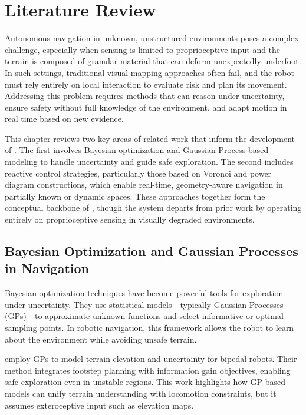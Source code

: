 \chapter{\leavevmode \newline Literature Review}
\label{chap:Literature Review}

Autonomous navigation in unknown, unstructured environments poses a complex challenge, especially when sensing is limited to proprioceptive input and the terrain is composed of granular material that can deform unexpectedly underfoot. In such settings, traditional visual mapping approaches often fail, and the robot must rely entirely on local interaction to evaluate risk and plan its movement. Addressing this problem requires methods that can reason under uncertainty, ensure safety without full knowledge of the environment, and adapt motion in real time based on new evidence.

This chapter reviews two key areas of related work that inform the development of \algoname. The first involves Bayesian optimization and Gaussian Process-based modeling to handle uncertainty and guide safe exploration. The second includes reactive control strategies, particularly those based on Voronoi and power diagram constructions, which enable real-time, geometry-aware navigation in partially known or dynamic spaces. These approaches together form the conceptual backbone of \algoname, though the system departs from prior work by operating entirely on proprioceptive sensing in visually degraded environments.

\section{Bayesian Optimization and Gaussian Processes in Navigation}

Bayesian optimization techniques have become powerful tools for exploration under uncertainty. They use statistical models—typically Gaussian Processes (GPs)—to approximate unknown functions and select informative or optimal sampling points. In robotic navigation, this framework allows the robot to learn about the environment while avoiding unsafe terrain.

\textcite{muenprasitivej2024bipedalsafenavigationuncertain} employ GPs to model terrain elevation and uncertainty for bipedal robots. Their method integrates footstep planning with information gain objectives, enabling safe exploration even in unstable regions. This work highlights how GP-based models can unify terrain understanding with locomotion constraints, but it assumes exteroceptive input such as elevation maps.

